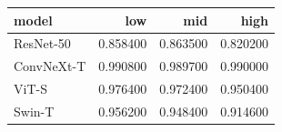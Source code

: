 \begin{tabular}{lrrr}
\toprule
model & low & mid & high \\
\midrule
ResNet-50 & 0.858400 & 0.863500 & 0.820200 \\
ConvNeXt-T & 0.990800 & 0.989700 & 0.990000 \\
ViT-S & 0.976400 & 0.972400 & 0.950400 \\
Swin-T & 0.956200 & 0.948400 & 0.914600 \\
\bottomrule
\end{tabular}
